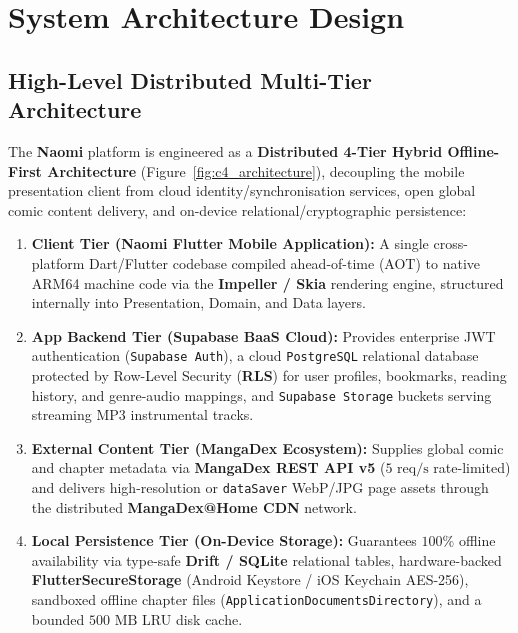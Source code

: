 \section{System Architecture Design}
\label{sec:architecture}

\subsection{High-Level Distributed Multi-Tier Architecture}
\label{subsec:high_level_arch}

The \textbf{Naomi} platform is engineered as a \textbf{Distributed 4-Tier Hybrid Offline-First Architecture} (Figure~\ref{fig:c4_architecture}), decoupling the mobile presentation client from cloud identity/synchronisation services, open global comic content delivery, and on-device relational/cryptographic persistence:

\begin{enumerate}
    \item \textbf{Client Tier (Naomi Flutter Mobile Application):} A single cross-platform Dart/Flutter codebase compiled ahead-of-time (AOT) to native ARM64 machine code via the \textbf{Impeller / Skia} rendering engine, structured internally into Presentation, Domain, and Data layers.
    \item \textbf{App Backend Tier (Supabase BaaS Cloud):} Provides enterprise JWT authentication (\texttt{Supabase Auth}), a cloud \texttt{PostgreSQL} relational database protected by Row-Level Security (\textbf{RLS}) for user profiles, bookmarks, reading history, and genre-audio mappings, and \texttt{Supabase Storage} buckets serving streaming MP3 instrumental tracks.
    \item \textbf{External Content Tier (MangaDex Ecosystem):} Supplies global comic and chapter metadata via \textbf{MangaDex REST API v5} ($5\text{ req/s}$ rate-limited) and delivers high-resolution or \texttt{dataSaver} WebP/JPG page assets through the distributed \textbf{MangaDex@Home CDN} network.
    \item \textbf{Local Persistence Tier (On-Device Storage):} Guarantees $100\%$ offline availability via type-safe \textbf{Drift / SQLite} relational tables, hardware-backed \textbf{FlutterSecureStorage} (Android Keystore / iOS Keychain AES-256), sandboxed offline chapter files (\texttt{ApplicationDocuments\-Directory}), and a bounded $500\text{ MB}$ LRU disk cache.
\end{enumerate}

